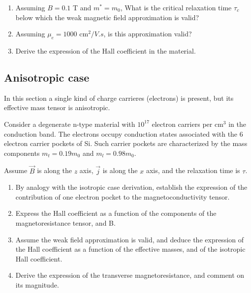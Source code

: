 \begin{enumerate}[label=(\roman*)]
\item Assuming $B=0.1$ T and $m^* = m_0$, What is the critical relaxation
  time $\tau_c$ below which the weak magnetic field approximation is valid?
\item Assuming $\mu_e = 1000 \text{ cm}^2/V.s$, is this approximation valid?
\item Derive the expression of the Hall coefficient in the material.
\end{enumerate}

\subsection*{Anisotropic case}

In this section a single kind of charge carrieres (electrons) is
present, but its effective mass tensor is
anisotropic.

Consider a degenerate
n-type material with $10^{17}$ electron carriers per cm$^3$ in the
conduction band. The electrons occupy conduction states associated
with the 6 electron carrier pockets of
Si. Such carrier pockets are characterized by the mass components
$m_t = 0.19 m_0$ and $m_l = 0.98 m_0$.

Assume $\vec{B}$ is along the $z$ axis, $\vec{j}$ is along the $x$
axis, and the relaxation time is $\tau$.

\begin{enumerate}[label=(\roman*)]
\item By analogy with the isotropic case derivation, establish the
  expression of the contribution of one electron pocket to the
  magnetoconductivity tensor.
\item Express the Hall coefficient as a function of the components of
  the magnetoresistance tensor, and B.
\item Assume the weak field approximation is valid, and deduce the
  expression of the Hall coefficient as a function of the effective
  masses, and of the isotropic Hall coefficient.
\item Derive the expression of the transverse magnetoresistance, and
  comment on its magnitude.
\end{enumerate}


